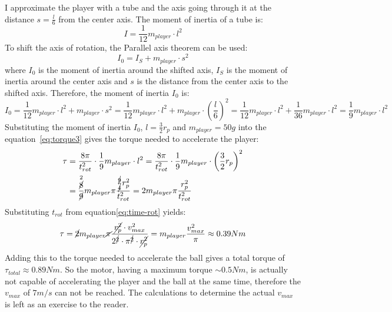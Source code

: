I approximate the player with a tube and the axis going through it at the distance $s=\frac{l}{6}$ from the center axis.
The moment of inertia of a tube is:
\begin{equation}
    \label{eq:moment_of_inertia}
    I = \frac{1}{12} m_{player} \cdot l^2
\end{equation}
To shift the axis of rotation, the Parallel axis theorem can be used:
\begin{equation}
    \label{eq:parallel_axis_theorem}
    I_0 = I_{S} + m_{player} \cdot s^2
\end{equation}
where $I_0$ is the moment of inertia around the shifted axis, $I_{S}$ is the moment of inertia around the center axis and $s$ is the distance from the center axis to the shifted axis.
Therefore, the moment of inertia $I_0$ is:
\begin{equation}
    \label{eq:moment_of_inertia_shifted}
    I_0 = \frac{1}{12} m_{player} \cdot l^2 + m_{player} \cdot s^2 = \frac{1}{12} m_{player} \cdot l^2 + m_{player} \cdot \left(\frac{l}{6}\right)^2 = \frac{1}{12} m_{player} \cdot l^2 + \frac{1}{36} m_{player} \cdot l^2 = \frac{1}{9} m_{player} \cdot l^2
\end{equation}
Substituting the moment of inertia $I_0$, $l=\frac{3}{2}r_p$ and $m_{player}=50g$ into the equation~\ref{eq:torque3} gives the torque needed to accelerate the player:
\begin{equation}
    \label{eq:torque4}
    \begin{split}
        \tau &= \frac{8\pi}{t_{rot}^2} \cdot \frac{1}{9} m_{player} \cdot l^2 = \frac{8\pi}{t_{rot}^2} \cdot \frac{1}{9} m_{player} \cdot \left(\frac{3}{2}r_p\right)^2\\
        &= \frac{\overset{2}{\cancel{8}}}{\cancel{9}}m_{player}\pi\frac{\frac{\cancel{9}}{\cancel{4}}r_p^2}{t_{rot}^2}=2m_{player}\pi\frac{r_p^2}{t_{rot}^2}
    \end{split}
\end{equation}
Substituting $t_{rot}$ from equation\ref{eq:time-rot} yields:
\begin{equation}
    \label{eq:torque5}
    \tau = \cancel{2}m_{player}\cancel{\pi}\frac{\cancel{r_p^2}\cdot v_{max}^2}{2^{\cancel{2}} \cdot \pi^{\cancel{2}} \cdot \cancel{r_p^2}} = m_{player}\frac{v_{max}^2}{\pi} \approx 0.39Nm
\end{equation}
Adding this to the torque needed to accelerate the ball gives a total torque of $\tau_{total} \approx 0.89Nm$.
So the motor, having a maximum torque $\sim0.5Nm$, is actually not capable of accelerating the player and the ball at the same time, therefore the $v_{max}$ of $7m/s$ can not be reached.
The calculations to determine the actual $v_{max}$ is left as an exercise to the reader.

